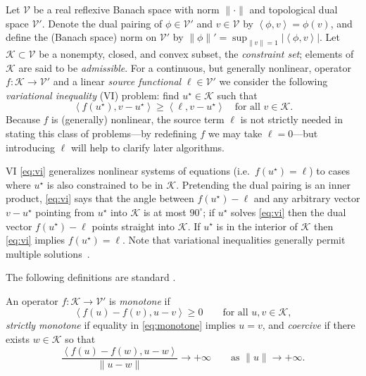 \documentclass[review,hidelinks,onefignum,onetabnum,final]{siamart220329}  %
\newcommand{\cK}{\mathcal{K}}
\newcommand{\cV}{\mathcal{V}}
\newcommand{\ip}[2]{\left<#1,#2\right>}
\begin{document}
Let $\cV$ be a real reflexive Banach space with norm $\|\cdot\|$ and topological dual space $\cV'$.  Denote the dual pairing of $\phi \in \cV'$ and $v\in\cV$ by $\ip{\phi}{v} = \phi(v)$, and define the (Banach space) norm on $\cV'$ by $\|\phi\|' = \sup_{\|v\|=1} |\!\ip{\phi}{v}\!|$.  Let $\cK \subset \cV$ be a nonempty, closed, and convex subset, the \emph{constraint set}; elements of $\cK$ are said to be \emph{admissible}.  For a continuous, but generally nonlinear, operator $f:\cK \to \cV'$ and a linear \emph{source functional} $\ell\in \cV'$ we consider the following \emph{variational inequality} (VI) problem: find $u^\star\in \cK$ such that
\begin{equation}
\ip{f(u^\star)}{v-u^\star} \ge \ip{\ell}{v-u^\star} \quad \text{for all } v\in \cK. \label{eq:vi}
\end{equation}
Because $f$ is (generally) nonlinear, the source term $\ell$ is not strictly needed in stating this class of problems---by redefining $f$ we may take $\ell=0$---but introducing $\ell$ will help to clarify later algorithms.

VI \eqref{eq:vi} generalizes nonlinear systems of equations (i.e.~$f(u^\star)=\ell$) to cases where $u^\star$ is also constrained to be in $\cK$.  Pretending the dual pairing is an inner product, \eqref{eq:vi} says that the angle between $f(u^\star)-\ell$ and any arbitrary vector $v-u^\star$ pointing from $u^\star$ into $\cK$ is at most $90^\circ$; if $u^\star$ solves \eqref{eq:vi} then the dual vector $f(u^\star)-\ell$ points straight into $\cK$.  If $u^\star$ is in the interior of $\cK$ then \eqref{eq:vi} implies $f(u^\star)=\ell$.
Note that variational inequalities generally permit multiple solutions~\cite{Farrell2019}.

The following definitions are standard \cite[for example]{KinderlehrerStampacchia1980}.

\begin{definition}  An operator $f:\cK \to \cV'$ is \emph{monotone} if
\begin{equation}
\ip{f(u)-f(v)}{u-v} \ge 0 \qquad \text{for all } u,v \in \cK, \label{eq:monotone}
\end{equation}
\emph{strictly monotone} if equality in \eqref{eq:monotone} implies $u=v$, and \emph{coercive} if there exists $w \in \cK$ so that
\begin{equation}
\frac{\ip{f(u)-f(w)}{u-w}}{\|u-w\|} \to +\infty \qquad \text{as } \|u\|\to +\infty. \label{eq:coercive}
\end{equation}
\end{definition}
\end{document}
